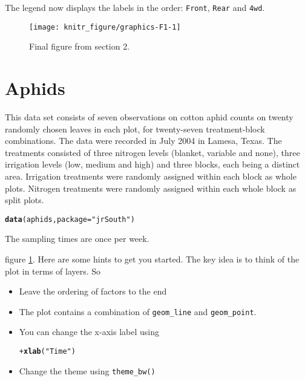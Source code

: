 \documentclass[a4paper,justified,openany]{tufte-handout}\usepackage[]{graphicx}\usepackage[]{color}
\makeatletter
\def\maxwidth{ %
  \ifdim\Gin@nat@width>\linewidth
    \linewidth
  \else
    \Gin@nat@width
  \fi
}
\newcommand{\hlstr}[1]{\textcolor[rgb]{0.2,0.2,0.2}{#1}}%
\newcommand{\hlopt}[1]{\textcolor[rgb]{0.102,0.102,0.102}{#1}}%
\newcommand{\hlstd}[1]{\textcolor[rgb]{0.102,0.102,0.102}{#1}}%
\newcommand{\hlkwc}[1]{\textcolor[rgb]{0.2,0.2,0.2}{#1}}%
\newcommand{\hlkwd}[1]{\textcolor[rgb]{0.102,0.102,0.102}{\textbf{#1}}}%
\newenvironment{kframe}{%
 \def\at@end@of@kframe{}%
 \ifinner\ifhmode%
  \def\at@end@of@kframe{\end{minipage}}%
  \begin{minipage}{\columnwidth}%
 \fi\fi%
 \def\FrameCommand##1{\hskip\@totalleftmargin \hskip-\fboxsep
 \colorbox{shadecolor}{##1}\hskip-\fboxsep
     \hskip-\linewidth \hskip-\@totalleftmargin \hskip\columnwidth}%
 \MakeFramed {\advance\hsize-\width
   \@totalleftmargin\z@ \linewidth\hsize
   \@setminipage}}%
 {\par\unskip\endMakeFramed%
 \at@end@of@kframe}
\newenvironment{knitrout}{}{} %
\newcommand{\cc}{\texttt}
\makeatother
\begin{document}
\noindent The legend now displays the labels in the order: \cc{Front}, \cc{Rear} and \cc{4wd}.

\begin{figure}[t]
\centering
\begin{knitrout}
\color{fgcolor}

{\centering \texttt{[image: knitr\_figure/graphics-F1-1]} 

}



\end{knitrout}
\caption{Final figure from section 2.}\label{F1}
\end{figure}

\section{Aphids}

This data set consists of seven observations on cotton aphid counts on twenty
randomly chosen leaves in each plot, for twenty-seven treatment-block
combinations. The data were recorded in July 2004 in Lamesa, Texas. The
treatments consisted of three nitrogen levels (blanket, variable and none),
three irrigation levels (low, medium and high) and three blocks, each being a
distinct area. Irrigation treatments were randomly assigned within each block as
whole plots. Nitrogen treatments were randomly assigned within each whole block
as split plots.

\begin{knitrout}
\color{fgcolor}\begin{kframe}
\begin{alltt}
\hlkwd{data}\hlstd{(aphids,} \hlkwc{package}\hlstd{=}\hlstr{"jrSouth"}\hlstd{)}
\end{alltt}
\end{kframe}
\end{knitrout}

\noindent The sampling times are once per week.

 figure \ref{F1}. Here are some hints to get you started.
The key idea is to think of the plot in terms of layers. So
\begin{itemize}
\item Leave the ordering of factors to the end
\item The plot contains a combination of \cc{geom\_line} and \cc{geom\_point}.
\item You can change the x-axis label using
\begin{knitrout}
\color{fgcolor}\begin{kframe}
\begin{alltt}
 \hlopt{+} \hlkwd{xlab}\hlstd{(}\hlstr{"Time"}\hlstd{)}
\end{alltt}
\end{kframe}
\end{knitrout}
\item Change the theme using \cc{theme\_bw()}
\end{itemize}
\newpage
\end{document}
